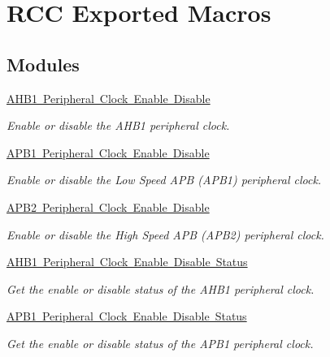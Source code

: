 \hypertarget{group___r_c_c___exported___macros}{}\section{R\+CC Exported Macros}
\label{group___r_c_c___exported___macros}
\subsection*{Modules}
\begin{DoxyCompactItemize}
\item 
\mbox{\hyperlink{group___r_c_c___a_h_b1___clock___enable___disable}{A\+H\+B1 Peripheral Clock Enable Disable}}
\begin{DoxyCompactList}\small\item\em Enable or disable the A\+H\+B1 peripheral clock. \end{DoxyCompactList}\item 
\mbox{\hyperlink{group___r_c_c___a_p_b1___clock___enable___disable}{A\+P\+B1 Peripheral Clock Enable Disable}}
\begin{DoxyCompactList}\small\item\em Enable or disable the Low Speed A\+PB (A\+P\+B1) peripheral clock. \end{DoxyCompactList}\item 
\mbox{\hyperlink{group___r_c_c___a_p_b2___clock___enable___disable}{A\+P\+B2 Peripheral Clock Enable Disable}}
\begin{DoxyCompactList}\small\item\em Enable or disable the High Speed A\+PB (A\+P\+B2) peripheral clock. \end{DoxyCompactList}\item 
\mbox{\hyperlink{group___r_c_c___a_h_b1___peripheral___clock___enable___disable___status}{A\+H\+B1 Peripheral Clock Enable Disable Status}}
\begin{DoxyCompactList}\small\item\em Get the enable or disable status of the A\+H\+B1 peripheral clock. \end{DoxyCompactList}\item 
\mbox{\hyperlink{group___r_c_c___a_p_b1___clock___enable___disable___status}{A\+P\+B1 Peripheral Clock Enable Disable  Status}}
\begin{DoxyCompactList}\small\item\em Get the enable or disable status of the A\+P\+B1 peripheral clock. \end{DoxyCompactList}\item 

\end{DoxyCompactItemize}
